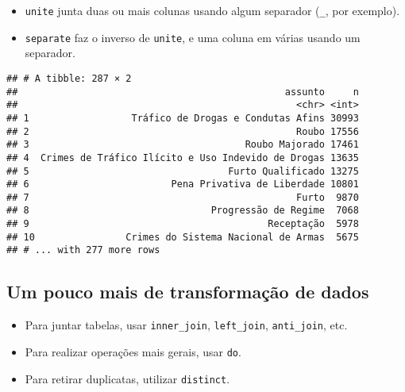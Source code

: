 \documentclass[]{book}
\newenvironment{Shaded}{\begin{snugshade}}{\end{snugshade}}
\newcommand{\KeywordTok}[1]{\textcolor[rgb]{0.13,0.29,0.53}{\textbf{{#1}}}}
\newcommand{\DataTypeTok}[1]{\textcolor[rgb]{0.13,0.29,0.53}{{#1}}}
\newcommand{\StringTok}[1]{\textcolor[rgb]{0.31,0.60,0.02}{{#1}}}
\newcommand{\OtherTok}[1]{\textcolor[rgb]{0.56,0.35,0.01}{{#1}}}
\newcommand{\NormalTok}[1]{{#1}}
\providecommand{\tightlist}{%
  \setlength{\itemsep}{0pt}\setlength{\parskip}{0pt}}
\begin{document}
\begin{itemize}
\tightlist
\item
  \texttt{unite} junta duas ou mais colunas usando algum separador
  (\texttt{\_}, por exemplo).
\item
  \texttt{separate} faz o inverso de \texttt{unite}, e uma coluna em
  várias usando um separador.
\end{itemize}

\begin{Shaded}
\end{Shaded}

\begin{verbatim}
## # A tibble: 287 × 2
##                                               assunto     n
##                                                 <chr> <int>
## 1                  Tráfico de Drogas e Condutas Afins 30993
## 2                                               Roubo 17556
## 3                                      Roubo Majorado 17461
## 4  Crimes de Tráfico Ilícito e Uso Indevido de Drogas 13635
## 5                                   Furto Qualificado 13275
## 6                         Pena Privativa de Liberdade 10801
## 7                                               Furto  9870
## 8                                Progressão de Regime  7068
## 9                                          Receptação  5978
## 10                Crimes do Sistema Nacional de Armas  5675
## # ... with 277 more rows
\end{verbatim}

\subsection{Um pouco mais de transformação de
dados}\label{um-pouco-mais-de-transformacao-de-dados}

\begin{itemize}
\tightlist
\item
  Para juntar tabelas, usar \texttt{inner\_join}, \texttt{left\_join},
  \texttt{anti\_join}, etc.
\item
  Para realizar operações mais gerais, usar \texttt{do}.
\item
  Para retirar duplicatas, utilizar \texttt{distinct}.
\end{itemize}


\end{document}
